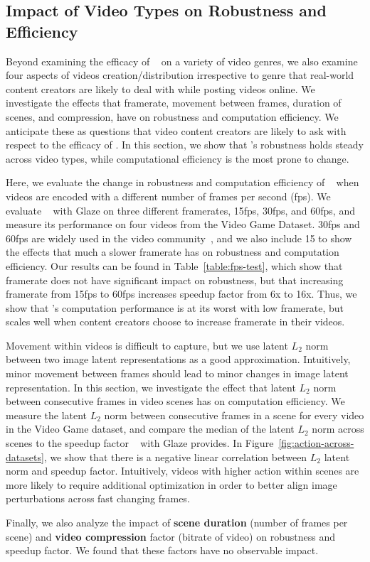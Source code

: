 \subsection{Impact of Video Types on Robustness and Efficiency}
\label{sec:video-types}
Beyond examining the efficacy of \system~ on a variety of video genres, we
also examine four aspects of videos creation/distribution irrespective to
genre that real-world content creators are likely to deal with while posting
videos online. We investigate the effects that framerate, movement between
frames, duration of scenes, and compression, have on robustness and
computation efficiency. We anticipate these as questions that video content
creators are likely to ask with respect to the efficacy of \system. In this
section, we show that \system's robustness holds steady across video types,
while computational efficiency is the most prone to change. 


Here, we evaluate the change in robustness and computation efficiency of
\system~ when videos are encoded with a different number of frames per second
(fps). We evaluate \system~ with Glaze on three different framerates, 15fps,
30fps, and 60fps, and measure its performance on four videos from the Video
Game Dataset. 30fps and 60fps are widely used in the video
community~\cite{ytvideosettings}, and we also include 15 to show the effects
that much a slower framerate has on robustness and computation
efficiency. Our results can be found in Table~\ref{table:fps-test}, which
show that framerate does not have significant impact on robustness, but that
increasing framerate from 15fps to 60fps increases speedup factor from 6x to
16x. Thus, we show that \system's computation performance is at its worst
with low framerate, but scales well when content creators choose to increase
framerate in their videos. 


Movement within videos is difficult to capture, but we use latent $L_2$ norm between
two image latent representations as a good approximation. Intuitively, minor
movement between frames should lead to minor changes in image latent
representation. In this section, we investigate the effect that latent $L_2$
norm between consecutive frames in video scenes has on computation
efficiency. We measure the latent $L_2$ norm between consecutive frames in a
scene for every video in the Video Game dataset, and compare the median of
the latent $L_2$ norm across scenes to the speedup factor \system~ with Glaze
provides. In Figure~\ref{fig:action-across-datasets}, we show that there is a
negative linear correlation between $L_2$ latent norm and
speedup factor. Intuitively, videos with higher action within scenes are more likely
to require additional optimization in order to better align image
perturbations across fast changing frames. 

Finally, we also analyze the impact of {\bf scene duration} (number of frames per
scene) and {\bf video compression} factor (bitrate of video) on robustness and
speedup factor. We found that these factors have no observable impact.


